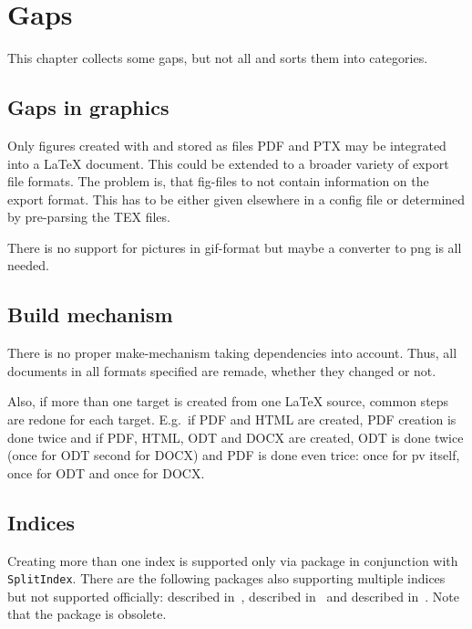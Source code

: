 \chapter{Gaps}\label{chap:gaps}

This chapter collects some gaps, but not all and sorts them into categories. 

\section{Gaps in graphics}\label{sec:gapGraph}

Only figures created with  and stored as files PDF and PTX 
may be integrated into a \LaTeX{} document. 
This could be extended to a broader variety of export file formats. 
The problem is, that fig-files to not contain information on the export
format. 
This has to be either given elsewhere in a config file 
or determined by pre-parsing the TEX files. 

There is no support for pictures in \gls{gif}-format 
but maybe a converter to \gls{png} is all needed. 

\section{Build mechanism}\label{sec:gapBuild}

There is no proper make-mechanism taking dependencies into account. 
Thus, all documents in all formats specified are remade, 
whether they changed or not. 

Also, if more than one target is created from one \LaTeX{} source, 
common steps are redone for each target. 
E.g.~if PDF and HTML are created, 
PDF creation is done twice and if PDF, HTML, ODT and DOCX are created, 
ODT is done twice (once for ODT second for DOCX) 
and PDF is done even trice: 
once for pv itself, once for ODT and once for DOCX. 

\section{Indices}\label{sec:gapIndices}

Creating more than one index is supported only 
via package  in conjunction with \texttt{SplitIndex}. 
There are the following packages also supporting multiple indices 
but not supported officially: 
 described in~\cite{IndexP}, 
 described in~\cite{AmsmidxP} and 
 described in~\cite{ImakeidxP}.
Note that the package  is obsolete. 

